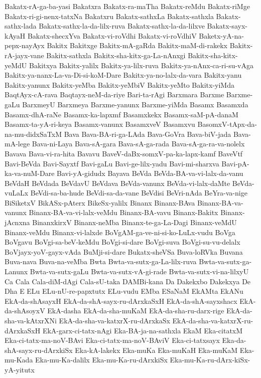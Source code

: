 {Bakatx-rA-ga-ba-yasi
Bakatxra
Bakatx-ra-maTha
Bakatx-reMdu
Bakatx-riMge
Bakatx-ri-gi-nenx-tatxNa
Bakatxru
Bakatx-sathxLa
Bakatx-sathxla
Bakatx-sathx-lada
Bakatx-sathx-la-da-lilx-ruva
Bakatx-sathx-la-da-lilxve
Bakatx-sayx-kAyaH
Bakatx-shecxYva
Bakatx-vi-roVdhi
Bakatx-vi-roVdhiV
Baketx-yA-na-pepx-nayAyx
Bakitx
Bakitxge
Bakitx-mA-gaRda
Bakitx-maM-di-rakekx
Bakitx-rA-jayx-vane
Bakitx-sathxla
Bakitx-sha-kitx-ga-La-nAnxgi
Bakitx-sha-kitx-yeMdU
Bakitxya
Bakitx-yalilx
Bakitx-ya-lilx-ruva
Bakitx-ya-nAnx-ca-ri-su-vAga
Bakitx-ya-nanx-La-va-Di-si-koM-Dare
Bakitx-ya-no-lalx-da-vara
Bakitx-yanu
Bakitx-yanunx
Bakitx-yeMba
Bakitx-yeMbiV
Bakitx-yeMto
Bakitx-yiMda
BaqtAyx-cA-rava
Baqtayx-neM-da-riye
Bari-ta-rAgi
Barxmara
Barxme
Barxme-gaLu
BarxmeyU
Barxmeya
Barxme-yanunx
Barxme-yiMda
Basamx
Basamxda
Basamx-dhA-raNe
Basamx-ka-lapxmf
Basamxkekx
Basamx-saM-pA-danaM
Basamx-ta-yA-ri-keya
Basamx-vanunx
BasamxveV
Basamxvu
BasomxV-tApx-da-na-mu-didxSaTxM
Bava
Bava-BA-ri-ga-LAda
Bava-GoVra
Bava-biV-jada
Bava-mA-lege
Bava-ni-Laya
Bava-sA-gara
Bava-sA-ga-rada
Bava-sA-ga-ra-va-nolelx
Bavava
Bava-vi-ra-hita
Bavavu
BaveV-daBx-somxV-pa-ka-lapx-kamf
BaveVtf
Bavi-BeVda
Bavi-Sayxtf
Bavi-gaLu
Bavi-ge-lilx-yadu
Bavi-mi-sharxva
Bavi-pA-ka-va-nuM-Dare
Bavi-yA-gidudx
Bayava
BeVda
BeVda-BA-va-vi-lalx-da-vanu
BeVdaH
BeVdada
BeVdavU
BeVdava
BeVda-vanunx
BeVda-vi-lalx-daMte
BeVda-vuLaLx
BeVdi-sa-ba-hude
BeVdi-sa-da-vane
BeVdisi
BeVri-nAda
BeYra-va-nige
BiSiketxV
BikASx-pAterx
BikeSx-yalilx
Binanx
Binanx-BAva
Binanx-BA-va-vanunx
Binanx-BA-va-vi-lalx-veMdu
Binanx-BA-vavu
Binanx-Bakitx
Binanx-jAcnxna
BinanxkirxV
Binanx-neMba
Binanx-te-ga-La-Dagi
Binanx-veMdU
Binanx-veMdu
Binanx-vi-lalxde
BoVgAM-ga-ve-ni-si-ko-LuLx-vudu
BoVga
BoVgavu
BoVgi-sa-beV-keMdu
BoVgi-si-dare
BoVgi-suva
BoVgi-su-vu-delalx
BoVjayx-yoV-gayx-vAda
BuMji-si-dare
Bukatx-sheVSa
Buva-loRVka
Buvana
Buva-nava
Buva-na-veMba
Bwta
Bwta-va-sutx-ga-La-lilx-ruva
Bwta-va-sutx-ga-Lanunx
Bwta-va-sutx-gaLu
Bwta-va-sutx-vA-gi-rade
Bwta-va-sutx-vi-na-lilxyU
Ca
Cala
Cala-diM-dAgi
Cala-sU-taka
DAMBi-kana
Da
Dakekxbo
Dakekxya
De
Dha
E
ELu
ELu-nU-re-papxtutx
ELu-vudu
EMba
ESaNaM
EkAMta
EkANu
EkA-da-shAsayxH
EkA-da-shA-sayx-ru-dArxkaSxH
EkA-da-shA-sayxshacx
EkA-da-shAsoyxV
EkA-dasha
EkA-da-sha-muKaM
EkA-da-sha-ru-darx-rige
EkA-da-sha-va-kAtxrXNi
EkA-da-sha-va-katxrX-ru-dArxkaSx
EkA-da-sha-va-katxrX-ru-dArxkaSxH
EkA-garx-ci-tatx-nAgi
Eka-BA-ja-na-sathxla
EkaM
Eka-citatxM
Eka-ci-tatx-ma-noV-BAvi
Eka-ci-tatx-ma-noV-BAviV
Eka-ci-tatxsayx
Eka-da-shA-sayx-ru-dArxkiSx
Eka-kA-lakekx
Eka-muKa
Eka-muKaH
Eka-muKaM
Eka-mu-Kada
Eka-mu-Ka-dalilx
Eka-mu-Ka-ru-dArxkiSx
Eka-mu-Ka-ru-dArx-kiSx-yA-yitutx
}
